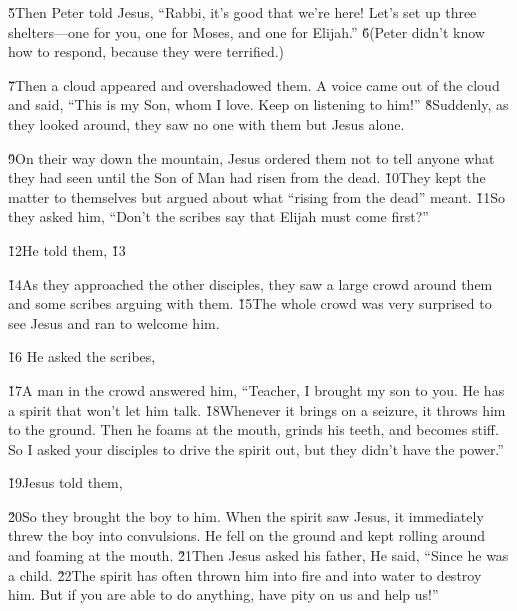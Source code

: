 \v{5}Then Peter told Jesus, ``Rabbi, it's good that we're here! Let's set up three shelters---one for you, one for Moses, and one for Elijah.'' \v{6}(Peter didn't know how to respond, because they were terrified.)

\v{7}Then a cloud appeared and overshadowed them. A voice came out of the cloud and said, ``This is my Son, whom I love. Keep on listening to him!'' \v{8}Suddenly, as they looked around, they saw no one with them but Jesus alone.

\v{9}On their way down the mountain, Jesus ordered them not to tell anyone what they had seen until the Son of Man had risen from the dead. \v{10}They kept the matter to themselves but argued about what ``rising from the dead'' meant. \v{11}So they asked him, ``Don't the scribes say that Elijah must come first?''

\v{12}He told them,  \v{13}

\v{14}As they approached the other disciples, they saw a large crowd around them and some scribes arguing with them. \v{15}The whole crowd was very surprised to see Jesus and ran to welcome him.

\v{16} He asked the scribes, 

\v{17}A man in the crowd answered him, ``Teacher, I brought my son to you. He has a spirit that won't let him talk. \v{18}Whenever it brings on a seizure, it throws him to the ground. Then he foams at the mouth, grinds his teeth, and becomes stiff. So I asked your disciples to drive the spirit out, but they didn't have the power.''

\v{19}Jesus told them, 

\v{20}So they brought the boy to him. When the spirit saw Jesus, it immediately threw the boy into convulsions. He fell on the ground and kept rolling around and foaming at the mouth. \v{21}Then Jesus asked his father,  He said, ``Since he was a child. \v{22}The spirit has often thrown him into fire and into water to destroy him. But if you are able to do anything, have pity on us and help us!''

